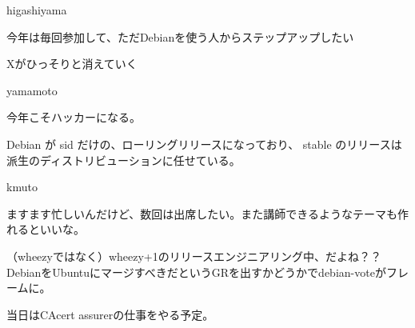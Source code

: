 \begin{prework}{ higashiyama }


今年は毎回参加して、ただDebianを使う人からステップアップしたい


Xがひっそりと消えていく

\end{prework}



\begin{prework}{ yamamoto }


今年こそハッカーになる。


Debian が sid だけの、ローリングリリースになっており、
stable のリリースは派生のディストリビューションに任せている。

\end{prework}


\begin{prework}{ kmuto }



 ますます忙しいんだけど、数回は出席したい。また講師できるようなテーマも作れるといいな。


 （wheezyではなく）wheezy+1のリリースエンジニアリング中、だよね？？ DebianをUbuntuにマージすべきだというGRを出すかどうかでdebian-voteがフレームに。

当日はCAcert assurerの仕事をやる予定。

\end{prework}



